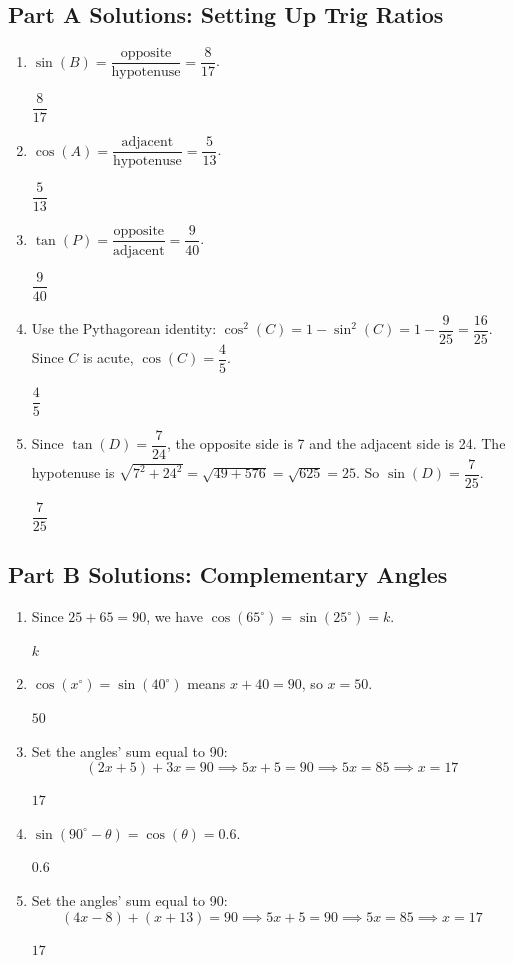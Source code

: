 \documentclass[14pt]{extarticle}
\begin{document}
\subsection*{Part A Solutions: Setting Up Trig Ratios}
\begin{enumerate}
  \item \(\sin(B) = \dfrac{\text{opposite}}{\text{hypotenuse}} = \dfrac{8}{17}\).

  \(\boxed{\dfrac{8}{17}}\)

  \item \(\cos(A) = \dfrac{\text{adjacent}}{\text{hypotenuse}} = \dfrac{5}{13}\).

  \(\boxed{\dfrac{5}{13}}\)

  \item \(\tan(P) = \dfrac{\text{opposite}}{\text{adjacent}} = \dfrac{9}{40}\).

  \(\boxed{\dfrac{9}{40}}\)

  \item Use the Pythagorean identity: \(\cos^2(C) = 1 - \sin^2(C) = 1 - \dfrac{9}{25} = \dfrac{16}{25}\). Since \(C\) is acute, \(\cos(C) = \dfrac{4}{5}\).

  \(\boxed{\dfrac{4}{5}}\)

  \item Since \(\tan(D) = \dfrac{7}{24}\), the opposite side is 7 and the adjacent side is 24. The hypotenuse is \(\sqrt{7^2 + 24^2} = \sqrt{49 + 576} = \sqrt{625} = 25\). So \(\sin(D) = \dfrac{7}{25}\).

  \(\boxed{\dfrac{7}{25}}\)
\end{enumerate}

\subsection*{Part B Solutions: Complementary Angles}
\begin{enumerate}
  \item Since \(25 + 65 = 90\), we have \(\cos(65^\circ) = \sin(25^\circ) = k\).

  \(\boxed{k}\)

  \item \(\cos(x^\circ) = \sin(40^\circ)\) means \(x + 40 = 90\), so \(x = 50\).

  \(\boxed{50}\)

  \item Set the angles' sum equal to 90:
  \[
  (2x + 5) + 3x = 90 \implies 5x + 5 = 90 \implies 5x = 85 \implies x = 17
  \]

  \(\boxed{17}\)

  \item \(\sin(90^\circ - \theta) = \cos(\theta) = 0.6\).

  \(\boxed{0.6}\)

  \item Set the angles' sum equal to 90:
  \[
  (4x - 8) + (x + 13) = 90 \implies 5x + 5 = 90 \implies 5x = 85 \implies x = 17
  \]

  \(\boxed{17}\)
\end{enumerate}
\end{document}

